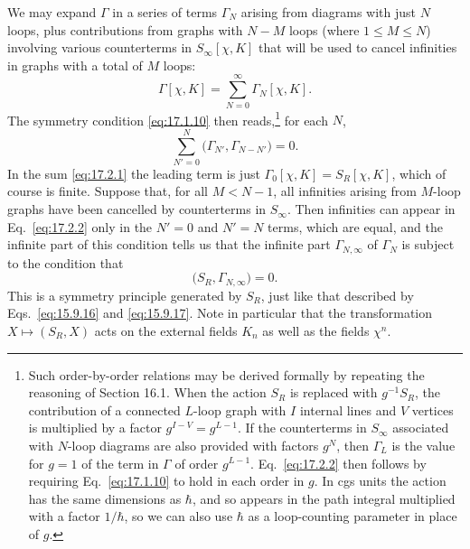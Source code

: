 We may expand $\Gamma$ in a series of terms $\Gamma_N$ arising from diagrams with just $N$ loops, plus contributions from graphs with $N-M$ loops (where $1\leq M\leq N$) involving various counterterms in $S_\infty[\chi,K]$ that will be used to cancel infinities in graphs with a total of $M$ loops:
\begin{equation}
\Gamma[\chi,K]=\sum_{N=0}^{\infty}\Gamma_N[\chi,K].
\tag{17.2.1}\label{eq:17.2.1}
\end{equation}
The symmetry condition \eqref{eq:17.1.10} then reads,\footnote{Such order-by-order relations may be derived formally by repeating the reasoning of Section 16.1. When the action $S_R$ is replaced with $g^{-1}S_R$, the contribution of a connected $L$-loop graph with $I$ internal lines and $V$ vertices is multiplied by a factor $g^{I-V}=g^{L-1}$. If the counterterms in $S_\infty$ associated with $N$-loop diagrams are also provided with factors $g^N$, then $\Gamma_L$ is the value for $g=1$ of the term in $\Gamma$ of order $g^{L-1}$. Eq.~\eqref{eq:17.2.2} then follows by requiring Eq.~\eqref{eq:17.1.10} to hold in each order in $g$. In cgs units the action has the same dimensions as $\hbar$, and so appears in the path integral multiplied with a factor $1/\hbar$, so we can also use $\hbar$ as a loop-counting parameter in place of $g$.} for each $N$,
\begin{equation}
\sum_{N'=0}^{N}\bigl(\Gamma_{N'},\Gamma_{N-N'}\bigr)=0.
\tag{17.2.2}\label{eq:17.2.2}
\end{equation}
In the sum \eqref{eq:17.2.1} the leading term is just $\Gamma_0[\chi,K]=S_R[\chi,K]$, which of course is finite. Suppose that, for all $M<N-1$, all infinities arising from $M$-loop graphs have been cancelled by counterterms in $S_\infty$. Then infinities can appear in Eq.~\eqref{eq:17.2.2} only in the $N'=0$ and $N'=N$ terms, which are equal, and the infinite part of this condition tells us that the infinite part $\Gamma_{N,\infty}$ of $\Gamma_N$ is subject to the condition that
\begin{equation}
\bigl(S_R,\Gamma_{N,\infty}\bigr)=0.
\tag{17.2.3}\label{eq:17.2.3}
\end{equation}
This is a symmetry principle generated by $S_R$, just like that described by Eqs.~\eqref{eq:15.9.16} and \eqref{eq:15.9.17}. Note in particular that the transformation $X\mapsto(S_R,X)$ acts on the external fields $K_n$ as well as the fields $\chi^n$.


